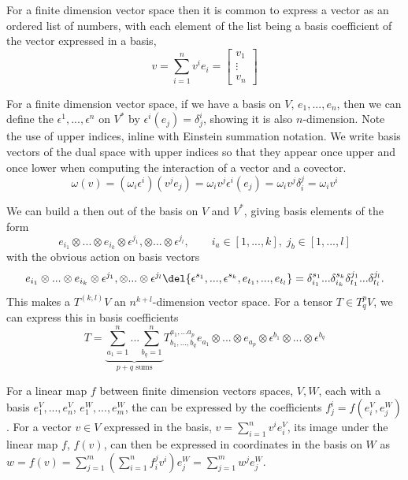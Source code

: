 For a finite dimension vector space then it is common to express a vector as an ordered list of numbers, with each element of the list being a basis coefficient of the vector expressed in a basis,
\[v = \sum_{i=1}^n v^ie_i = \begin{bmatrix}
	v_1 \\ \vdots \\ v_n
\end{bmatrix}\]

For a finite dimension vector space, if we have a basis on \(V\), \(e_1, .
.., e_n\), then we can define the  \(\epsilon^1, ..., \epsilon^n\) on \(V^*\) by \(\epsilon^i(e_j) = \delta^i_j\), showing it is also \(n\)-dimension.
Note the use of upper indices, inline with Einstein summation notation.
We write basis vectors of the dual space with upper indices so that they appear once upper and once lower when computing the interaction of a vector and a covector.
\[\omega(v) = (\omega_i\epsilon^i)(v^je_j) = \omega_iv^j \epsilon^i(e_j) = \omega_iv^j \delta^j_i = \omega_i v^i\]

We can build a  then out of the basis on \(V\) and \(V^*\), giving basis elements of the form \[e_{i_1}\otimes .
	..\otimes e_{i_k}\otimes \epsilon^{j_1},  \otimes ...\otimes \epsilon^{j_l}, \quad\quad i_{a}\in [1,..., k], \; j_b \in [1,..., l]\] with the obvious action on basis vectors \[e_{i_1}\otimes ...\otimes e_{i_k}\otimes \epsilon^{j_1},  \otimes ...\otimes \epsilon^{j_l}\del{\epsilon^{s_1}, ..., \epsilon^{s_k}, e_{t_1}, ..., e_{t_l}} = \delta^{s_1}_{i_1} ... \delta^{s_k}_{i_k} \delta^{j_1}_{t_1} ... \delta^{j_l}_{t_l} .\]
This makes a \(T^{(k,l)}V\) an \(n^{k+l}\)-dimension vector space.
For a tensor \(T\in T_q^pV\), we can express this in basis coefficients 
\[T = \underbrace{\sum_{a_1=1}^n ... \sum_{b_q =1}^n}_{p+q\text{ sums}} T_{b_1, ..., b_q}^{a_1, ...a_p} e_{a_1}\otimes...\otimes e_{a_p} \otimes \epsilon^{b_1}\otimes...\otimes \epsilon^{b_q}\]

For a linear map \(f\) between finite dimension vectors spaces, \(V, W\), each with a basis \(e_1^V, ..., e_n^V\), \(e_1^W, ..., e_m^W\), the  can be expressed by the coefficients \(f^i_j = f(e_i^V, e_j^W)\).
For a vector \(v\in V\) expressed in the basis, \(v = \sum_{i=1}^{n} v^i e_i^V\), its image under the linear map \(f\), \(f(v)\), can then be expressed in coordinates in the basis on \(W\) as \(w = f(v) = \sum_{j=1}^{m} (\sum_{i=1}^n f_i^j v^i) e_j^W = \sum_{j=1}^m w^j e_j^W\).


